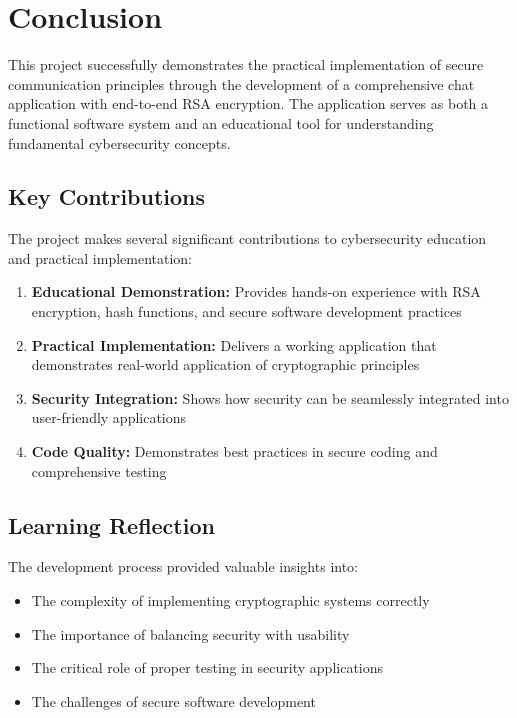 \documentclass[12pt,a4paper]{article}
\begin{document}
\section{Conclusion}

This project successfully demonstrates the practical implementation of secure communication principles through the development of a comprehensive chat application with end-to-end RSA encryption. The application serves as both a functional software system and an educational tool for understanding fundamental cybersecurity concepts.

\subsection{Key Contributions}

The project makes several significant contributions to cybersecurity education and practical implementation:

\begin{enumerate}
    \item \textbf{Educational Demonstration:} Provides hands-on experience with RSA encryption, hash functions, and secure software development practices
    \item \textbf{Practical Implementation:} Delivers a working application that demonstrates real-world application of cryptographic principles
    \item \textbf{Security Integration:} Shows how security can be seamlessly integrated into user-friendly applications
    \item \textbf{Code Quality:} Demonstrates best practices in secure coding and comprehensive testing
\end{enumerate}

\subsection{Learning Reflection}

The development process provided valuable insights into:

\begin{itemize}
    \item The complexity of implementing cryptographic systems correctly
    \item The importance of balancing security with usability
    \item The critical role of proper testing in security applications
    \item The challenges of secure software development
\end{itemize}
\end{document}
